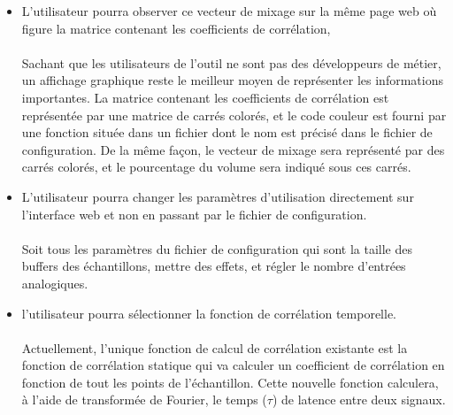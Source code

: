 \documentclass{article}
\begin{document}
\begin{itemize}
       \paragraph{}
       
 \item L'utilisateur pourra observer ce vecteur de mixage sur la même page
       web où figure la matrice contenant les coefficients de corrélation,
       \paragraph{}
       Sachant que les utilisateurs de l'outil ne sont pas des développeurs de
       métier, un affichage graphique reste le meilleur moyen de représenter les
       informations importantes. La matrice contenant les coefficients de
       corrélation est représentée par une matrice de carrés colorés, et le
       code couleur est fourni par une fonction située dans un fichier dont le
       nom est précisé dans le fichier de configuration. De la même façon, le
       vecteur de mixage sera représenté par des carrés colorés, et le
       pourcentage du volume sera indiqué sous ces carrés.\\
       
 \item L'utilisateur pourra changer les paramètres d'utilisation directement sur
       l'interface web et non en passant par le fichier de configuration.
       \paragraph{}
       Soit tous les paramètres du fichier de configuration qui sont la taille des buffers
       des échantillons, mettre des effets, et régler le nombre d'entrées analogiques.
       
 \item l'utilisateur pourra sélectionner la fonction de corrélation temporelle.
       \paragraph{}
       Actuellement, l'unique fonction de calcul de corrélation existante est
       la fonction de corrélation statique qui va calculer un coefficient de corrélation
       en fonction de tout les points de l’échantillon. Cette nouvelle fonction
       calculera, à l'aide de transformée de Fourier, le temps ($\tau$) de latence
       entre deux signaux.
       
       
\end{itemize}
\end{document}
